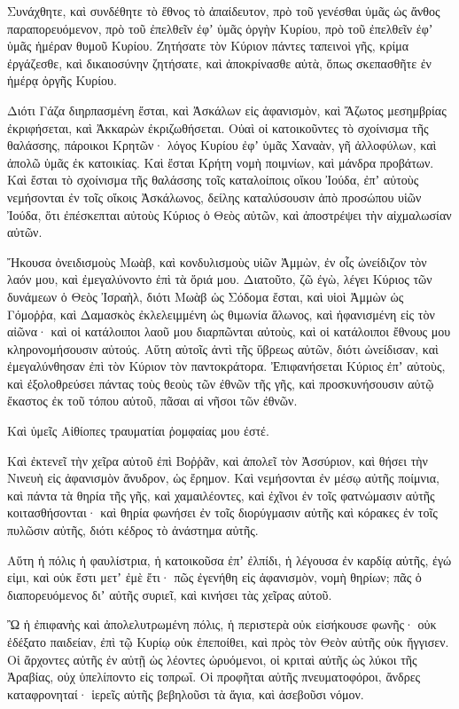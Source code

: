 \begin{spacing}{1.1}
\begin{multicols}{2}
Συνάχθητε, καὶ συνδέθητε τὸ ἔθνος τὸ ἀπαίδευτον,
πρὸ τοῦ γενέσθαι ὑμᾶς ὡς ἄνθος παραπορευόμενον, πρὸ τοῦ ἐπελθεῖν ἐφʼ ὑμᾶς ὀργὴν Κυρίου, πρὸ τοῦ ἐπελθεῖν ἐφʼ ὑμᾶς ἡμέραν θυμοῦ Κυρίου.
Ζητήσατε τὸν Κύριον πάντες ταπεινοὶ γῆς, κρίμα ἐργάζεσθε, καὶ δικαιοσύνην ζητήσατε, καὶ ἀποκρίνασθε αὐτὰ, ὅπως σκεπασθῆτε ἐν ἡμέρᾳ ὀργῆς Κυρίου.

Διότι Γάζα διηρπασμένη ἔσται, καὶ Ἀσκάλων εἰς ἀφανισμὸν, καὶ Ἄζωτος μεσημβρίας ἐκριφήσεται, καὶ Ἀκκαρὼν ἐκριζωθήσεται.
Οὐαὶ οἱ κατοικοῦντες τὸ σχοίνισμα τῆς θαλάσσης, πάροικοι Κρητῶν· λόγος Κυρίου ἐφʼ ὑμᾶς Χαναὰν, γῆ ἀλλοφύλων, καὶ ἀπολῶ ὑμᾶς ἐκ κατοικίας.
Καὶ ἔσται Κρήτη νομὴ ποιμνίων, καὶ μάνδρα προβάτων.
Καὶ ἔσται τὸ σχοίνισμα τῆς θαλάσσης τοῖς καταλοίποις οἴκου Ἰούδα, ἐπʼ αὐτοὺς νεμήσονται ἐν τοῖς οἴκοις Ἀσκάλωνος, δείλης καταλύσουσιν ἀπὸ προσώπου υἱῶν Ἰούδα, ὅτι ἐπέσκεπται αὐτοὺς Κύριος ὁ Θεὸς αὐτῶν, καὶ ἀποστρέψει τὴν αἰχμαλωσίαν αὐτῶν.

Ἤκουσα ὀνειδισμοὺς Μωὰβ, καὶ κονδυλισμοὺς υἱῶν Ἀμμὼν, ἐν οἷς ὠνείδιζον τὸν λαόν μου, καὶ ἐμεγαλύνοντο ἐπὶ τὰ ὅριά μου.
Διατοῦτο, ζῶ ἐγὼ, λέγει Κύριος τῶν δυνάμεων ὁ Θεὸς Ἰσραὴλ, διότι Μωὰβ ὡς Σόδομα ἔσται, καὶ υἱοὶ Ἀμμὼν ὡς Γόμοῤῥα, καὶ Δαμασκὸς ἐκλελειμμένη ὡς θιμωνία ἅλωνος, καὶ ἠφανισμένη εἰς τὸν αἰῶνα· καὶ οἱ κατάλοιποι λαοῦ μου διαρπῶνται αὐτοὺς, καὶ οἱ κατάλοιποι ἔθνους μου κληρονομήσουσιν αὐτούς.
Αὕτη αὐτοῖς ἀντὶ τῆς ὕβρεως αὐτῶν, διότι ὠνείδισαν, καὶ ἐμεγαλύνθησαν ἐπὶ τὸν Κύριον τὸν παντοκράτορα.
Ἐπιφανήσεται Κύριος ἐπʼ αὐτοὺς, καὶ ἐξολοθρεύσει πάντας τοὺς θεοὺς τῶν ἐθνῶν τῆς γῆς, καὶ προσκυνήσουσιν αὐτῷ ἔκαστος ἐκ τοῦ τόπου αὐτοῦ, πᾶσαι αἱ νῆσοι τῶν ἐθνῶν.

Καὶ ὑμεῖς Αἰθίοπες τραυματίαι ῥομφαίας μου ἐστέ.

Καὶ ἐκτενεῖ τὴν χεῖρα αὐτοῦ ἐπὶ Βοῤῥᾶν, καὶ ἀπολεῖ τὸν Ἀσσύριον, καὶ θήσει τὴν Νινευὴ εἰς ἀφανισμὸν ἄνυδρον, ὡς ἔρημον.
Καὶ νεμήσονται ἐν μέσῳ αὐτῆς ποίμνια, καὶ πάντα τὰ θηρία τῆς γῆς, καὶ χαμαιλέοντες, καὶ ἐχῖνοι ἐν τοῖς φατνώμασιν αὐτῆς κοιτασθήσονται· καὶ θηρία φωνήσει ἐν τοῖς διορύγμασιν αὐτῆς καὶ κόρακες ἐν τοῖς πυλῶσιν αὐτῆς, διότι κέδρος τὸ ἀνάστημα αὐτῆς.

Αὕτη ἡ πόλις ἡ φαυλίστρια, ἡ κατοικοῦσα ἐπʼ ἐλπίδι, ἡ λέγουσα ἐν καρδίᾳ αὐτῆς, ἐγώ εἰμι, καὶ οὐκ ἔστι μετʼ ἐμὲ ἔτι· πῶς ἐγενήθη εἰς ἀφανισμὸν, νομὴ θηρίων; πᾶς ὁ διαπορευόμενος διʼ αὐτῆς συριεῖ, καὶ κινήσει τὰς χεῖρας αὐτοῦ.

Ὢ ἡ ἐπιφανὴς καὶ ἀπολελυτρωμένη πόλις,
ἡ περιστερὰ οὐκ εἰσήκουσε φωνῆς· οὐκ ἐδέξατο παιδείαν, ἐπὶ τῷ Κυρίῳ οὐκ ἐπεποίθει, καὶ πρὸς τὸν Θεὸν αὐτῆς οὐκ ἤγγισεν.
Οἱ ἄρχοντες αὐτῆς ἐν αὐτῇ ὡς λέοντες ὠρυόμενοι, οἱ κριταὶ αὐτῆς ὡς λύκοι τῆς Ἀραβίας, οὐχ ὑπελίποντο εἰς τοπρωΐ.
Οἱ προφῆται αὐτῆς πνευματοφόροι, ἄνδρες καταφρονηταί· ἱερεῖς αὐτῆς βεβηλοῦσι τὰ ἅγια, καὶ ἀσεβοῦσι νόμον.


\end{multicols}
\end{spacing}
